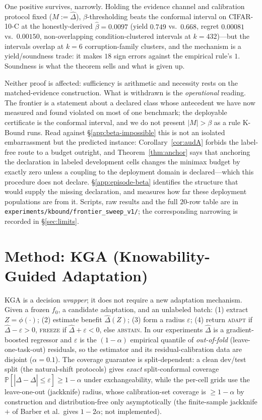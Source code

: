 \documentclass[conference]{IEEEtran}
\theoremstyle{plain}
\theoremstyle{definition}
\renewcommand{\Pr}{\mathbb{P}}
\begin{document}
One positive survives, narrowly. Holding the evidence channel and calibration protocol fixed
($M:=\widehat\Delta$), $\beta$-thresholding beats the conformal interval on CIFAR-10-C at the
honestly-derived $\widehat\beta=0.0097$ (yield $0.749$ vs.\ $0.668$, regret $0.00081$ vs.\
$0.00150$, non-overlapping condition-clustered intervals at $k{=}432$)---but the intervals overlap
at $k{=}6$ corruption-family clusters, and the mechanism is a yield/soundness trade: it makes $18$
sign errors against the empirical rule's $1$. Soundness is what the theorem sells and what is given
up.

Neither proof is affected: sufficiency is arithmetic and necessity rests on the matched-evidence
construction. What is withdrawn is the \emph{operational} reading. The frontier is a statement about
a declared class whose antecedent we have now measured and found violated on most of one benchmark;
the deployable certificate is the conformal interval, and we do not present $|M|>\beta$ as a rule
K-Bound runs. Read against \S\ref{app:beta-impossible} this is not an isolated embarrassment but the
predicted instance: Corollary~\ref{cor:audA} forbids the label-free route to a budget outright, and
Theorem~\ref{thm:anchor} says that anchoring the declaration in labeled development cells changes
the minimax budget by exactly zero unless a coupling to the deployment domain is declared---which
this procedure does not declare. \S\ref{app:episode-beta} identifies the structure that would
supply the missing declaration, and measures how far these deployment populations are from it. Scripts, raw results and the full $20$-row table are in
\texttt{experiments/kbound/frontier\_sweep\_v1/}; the corresponding narrowing is recorded in
\S\ref{sec:limits}.


\begingroup\sloppy

\endgroup


\section{Method: \textsc{KGA} (Knowability-Guided Adaptation)}
\textsc{KGA} is a decision \emph{wrapper}; it does not require a new adaptation
mechanism. Given a frozen $f_0$, a candidate adaptation, and an unlabeled batch:
(1) extract $Z=\phi(\cdot)$; (2) estimate benefit $\widehat\Delta(Z)$; (3) form a
radius $\varepsilon$; (4) return \textsc{adapt} if $\widehat\Delta-\varepsilon>0$,
\textsc{freeze} if $\widehat\Delta+\varepsilon<0$, else \textsc{abstain}. In our
experiments $\widehat\Delta$ is a gradient-boosted regressor and $\varepsilon$ is the $(1-\alpha)$
empirical quantile of \emph{out-of-fold} (leave-one-task-out) residuals, so the estimator and its
residual-calibration data are disjoint ($\alpha=0.1$). The coverage guarantee is split-dependent: a
clean dev/test split (the natural-shift protocols) gives \emph{exact} split-conformal coverage
$\Pr[|\widehat\Delta-\Delta|\le\varepsilon]\ge1-\alpha$ under exchangeability, while the per-cell
grids use the leave-one-out (jackknife) radius, whose calibration-set coverage is $\ge1-\alpha$ by
construction and distribution-free only asymptotically (the finite-sample jackknife$+$ of
Barber et al.\ gives $1-2\alpha$; not implemented).
\end{document}

